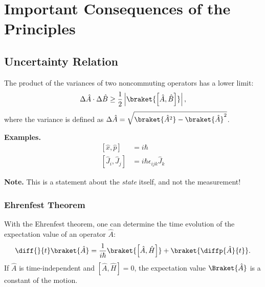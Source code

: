 \section{Important Consequences of the Principles}
\subsection{Uncertainty Relation}

The product of the variances of two noncommuting operators has a lower limit:
\begin{align}
    \Delta \hat{A} \cdot \Delta \hat{B} \geq \frac{1}{2} \left| \braket{\left[\hat{A},\hat{B}\right]} \right|,
\end{align}
where the variance is defined as $\Delta \hat{A} = \sqrt{\braket{\hat{A}^2}-\braket{\hat{A}}^2}$.

\textbf{Examples.}
\begin{align}
	\left[ \hat{x}, \hat{p} \right] &= i \hbar \\
\left[ \hat{J}_i , \hat{J}_j \right] &= i \hbar \epsilon_{ijk} \hat{J}_k
\end{align}
				
\textbf{Note.} This is a statement about the \emph{state} itself, and not the measurement!

\subsubsection{Ehrenfest Theorem}
With the Ehrenfest theorem, one can determine the time evolution of the expectation value of an operator $\hat{A}$:
\begin{align}
 \diff{}{t}\braket{\hat{A}}=\frac{1}{i\hbar}\braket{\left[\hat{A},\hat{H}\right]}+\braket{\diffp{\hat{A}}{t}}. \label{eq:ehrenfest}
\end{align}
				If $\hat{A}$ is time-independent and $\left[\hat{A},\hat{H}\right]=0$, the expectation value $\Braket{\hat{A}}$ is a constant of the motion.

	